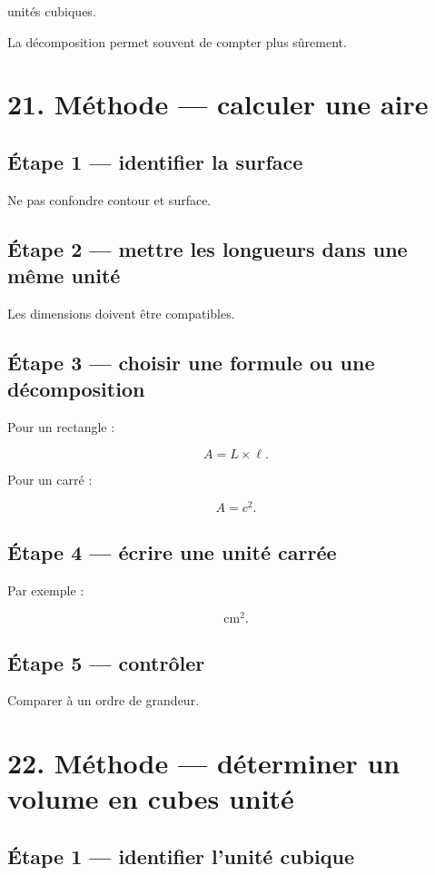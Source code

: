 unités cubiques.

La décomposition permet souvent de compter plus sûrement.

\section{21. Méthode — calculer une aire}

\subsection{Étape 1 — identifier la surface}

Ne pas confondre contour et surface.

\subsection{Étape 2 — mettre les longueurs dans une même unité}

Les dimensions doivent être compatibles.

\subsection{Étape 3 — choisir une formule ou une décomposition}

Pour un rectangle :

\[
A=L\times\ell.
\]

Pour un carré :

\[
A=c^2.
\]

\subsection{Étape 4 — écrire une unité carrée}

Par exemple :

\[
\text{cm}^2.
\]

\subsection{Étape 5 — contrôler}

Comparer à un ordre de grandeur.

\section{22. Méthode — déterminer un volume en cubes unité}

\subsection{Étape 1 — identifier l’unité cubique}

